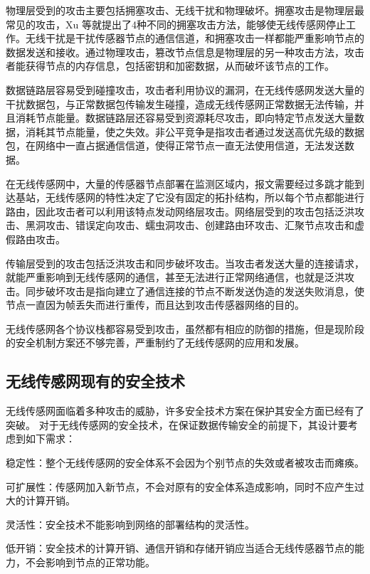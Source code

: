 物理层受到的攻击主要包括拥塞攻击、无线干扰和物理破坏。拥塞攻击是物理层最常见的攻击，Xu 等就提出了4种不同的拥塞攻击方法，能够使无线传感网停止工作。无线干扰是干扰传感器节点的通信信道，和拥塞攻击一样都能严重影响节点的数据发送和接收。通过物理攻击，篡改节点信息是物理层的另一种攻击方法，攻击者能获得节点的内存信息，包括密钥和加密数据，从而破坏该节点的工作。

数据链路层容易受到碰撞攻击，攻击者利用协议的漏洞，在无线传感网发送大量的干扰数据包，与正常数据包传输发生碰撞，造成无线传感网正常数据无法传输，并且消耗节点能量。数据链路层还容易受到资源耗尽攻击，即向特定节点发送大量数据，消耗其节点能量，使之失效。非公平竞争是指攻击者通过发送高优先级的数据包，在网络中一直占据通信信道，使得正常节点一直无法使用信道，无法发送数据。

在无线传感网中，大量的传感器节点部署在监测区域内，报文需要经过多跳才能到达基站，无线传感网的特性决定了它没有固定的拓扑结构，所以每个节点都能进行路由，因此攻击者可以利用该特点发动网络层攻击。网络层受到的攻击包括泛洪攻击、黑洞攻击、错误定向攻击、蠕虫洞攻击、创建路由环攻击、汇聚节点攻击和虚假路由攻击。

传输层受到的攻击包括泛洪攻击和同步破坏攻击。当攻击者发送大量的连接请求，就能严重影响到无线传感网的通信，甚至无法进行正常网络通信，也就是泛洪攻击。同步破坏攻击是指向建立了通信连接的节点不断发送伪造的发送失败消息，使节点一直因为帧丢失而进行重传，而且达到攻击传感器网络的目的。

无线传感网各个协议栈都容易受到攻击，虽然都有相应的防御的措施，但是现阶段的安全机制方案还不够完善，严重制约了无线传感网的应用和发展。


\subsection{无线传感网现有的安全技术}

无线传感网面临着多种攻击的威胁，许多安全技术方案在保护其安全方面已经有了突破。
对于无线传感网的安全技术，在保证数据传输安全的前提下，其设计要考虑到如下需求：
\begin{compactitem}
  \item 稳定性：整个无线传感网的安全体系不会因为个别节点的失效或者被攻击而瘫痪。
  \item 可扩展性：传感网加入新节点，不会对原有的安全体系造成影响，同时不应产生过大的计算开销。
  \item 灵活性：安全技术不能影响到网络的部署结构的灵活性。
  \item 低开销：安全技术的计算开销、通信开销和存储开销应当适合无线传感器节点的能力，不会影响到节点的正常功能。
\end{compactitem}


